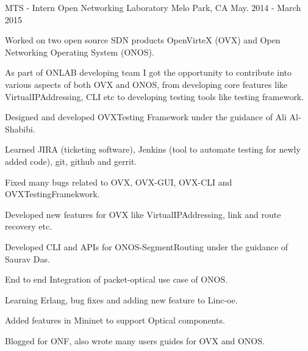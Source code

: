 \begin{cventries}
  \cventry
    {MTS - Intern} %
    {Open Networking Laboratory} %
    {Melo Park, CA} %
    {May. 2014 - March 2015} %
    {
      \begin{cvitems} %
        \item {Worked on two open source SDN products OpenVirteX (OVX) and Open Networking Operating System (ONOS).}
        \item {As part of ONLAB developing team I got the opportunity to contribute into various aspects of both OVX and 
                ONOS, from developing core features like VirtualIPAddressing, CLI etc to developing testing tools
                like testing framework.}
        \item {Designed and developed OVXTesting Framework under the guidance of Ali Al-Shabibi.}
        \item {Learned JIRA (ticketing software), Jenkins (tool to automate testing for newly added code), git, github and gerrit.}
        \item {Fixed many bugs related to OVX, OVX-GUI, OVX-CLI and OVXTestingFramekwork.}
        \item {Developed new features for OVX like VirtualIPAddressing, link and route recovery etc.}
        \item {Developed CLI and APIs for ONOS-SegmentRouting under the guidance of Saurav Das.}
        \item {End to end Integration of packet-optical use case of ONOS.}
        \item {Learning Erlang, bug fixes and adding new feature to Linc-oe.}
        \item {Added features in Mininet to support Optical components.}
        \item {Blogged for ONF, also wrote many users guides for OVX and ONOS.}
      \end{cvitems}
    }

\end{cventries}
